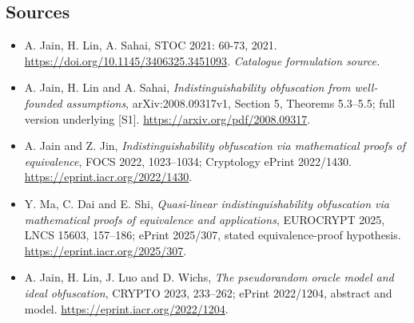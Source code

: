 \documentclass[11pt,a4paper]{article}
\numberwithin{equation}{section}
\begin{document}
\subsection{Sources}
\begin{itemize}\raggedright
\item[\textnormal{[S1]}]\hypertarget{source:statement:1}{} A. Jain, H. Lin, A. Sahai, STOC 2021: 60-73, 2021.
\url{https://doi.org/10.1145/3406325.3451093}.
{\small\textit{Catalogue formulation source.}}
\item[\textnormal{[E1]}]\hypertarget{extra:statement:1}{} A. Jain, H. Lin and A. Sahai,
\emph{Indistinguishability obfuscation from well-founded assumptions},
arXiv:2008.09317v1, Section 5, Theorems 5.3--5.5; full version underlying [S1].
\url{https://arxiv.org/pdf/2008.09317}.
\item[\textnormal{[E2]}]\hypertarget{extra:statement:2}{} A. Jain and Z. Jin,
\emph{Indistinguishability obfuscation via mathematical proofs of equivalence},
FOCS 2022, 1023--1034; Cryptology ePrint 2022/1430.
\url{https://eprint.iacr.org/2022/1430}.
\item[\textnormal{[E3]}]\hypertarget{extra:statement:3}{} Y. Ma, C. Dai and E. Shi,
\emph{Quasi-linear indistinguishability obfuscation via mathematical proofs
of equivalence and applications}, EUROCRYPT 2025, LNCS 15603, 157--186;
ePrint 2025/307, stated equivalence-proof hypothesis.
\url{https://eprint.iacr.org/2025/307}.
\item[\textnormal{[E4]}]\hypertarget{extra:statement:4}{} A. Jain, H. Lin, J. Luo
and D. Wichs, \emph{The pseudorandom oracle model and ideal obfuscation},
CRYPTO 2023, 233--262; ePrint 2022/1204, abstract and model.
\url{https://eprint.iacr.org/2022/1204}.

\end{itemize}
\end{document}
